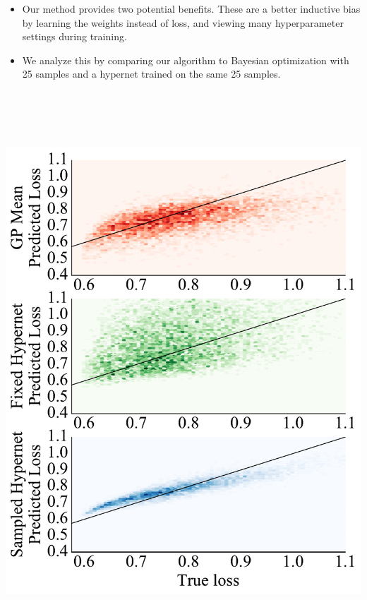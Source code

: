 \documentclass[landscape,a0b,final,a4resizeable]{include/a0poster}
\begin{document}
\begin{poster}
\begin{multicols}{3}
\newpage
{}
\begin{itemize}
	\item Our method provides two potential benefits.  These are a better inductive bias by learning the weights instead of loss, and viewing many hyperparameter settings during training.
	\item We analyze this by comparing our algorithm to Bayesian optimization with 25 samples and a hypernet trained on the same 25 samples.
\end{itemize}
\vphantom{A}
\begin{minipage}[c]{36cm}
\begin{center}
  \includegraphics[height=21cm]{figures/learn_vs_true_loss_scatter.pdf}

\end{center}
\end{minipage}
\end{multicols}
\end{poster}
\end{document}
